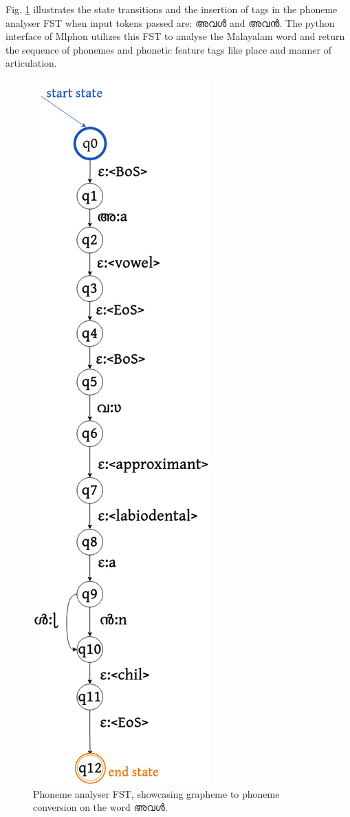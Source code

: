 \documentclass{ieeeaccess}
\begin{document}
Fig. \ref{phanalysissfst} illustrates the state transitions and the insertion of tags in the phoneme analyser FST when input tokens passed are: {\mal അവൾ} and {\mal അവൻ}. The python interface of Mlphon utilizes this FST to  analyse the Malayalam word and return the sequence of phonemes and phonetic feature tags like place and manner of articulation.


\begin{figure}[!h]
	\centering
	\includegraphics[scale=0.25]{analysis-dawio.png}
	\caption{Phoneme analyser FST, showcasing grapheme to phoneme conversion on the word {\mal അവൾ}.}
	\label{phanalysissfst}
\end{figure}
\end{document}
